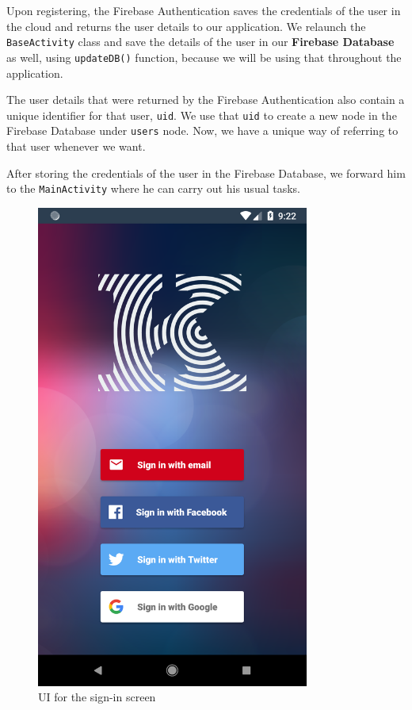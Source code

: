 Upon registering, the Firebase Authentication saves the credentials of the user in the cloud and returns the user details to our application. We relaunch the \texttt{BaseActivity} class and save the details of the user in our \textbf{Firebase Database} as well, using \texttt{updateDB()} function, because we will be using that throughout the application.

The user details that were returned by the Firebase Authentication also contain a unique identifier for that user, \texttt{uid}. We use that \texttt{uid} to create a new node in the Firebase Database under \texttt{users} node. Now, we have a unique way of referring to that user whenever we want.

After storing the credentials of the user in the Firebase Database, we forward him to the \texttt{MainActivity} where he can carry out his usual tasks.

\begin{figure}[H]
	\centering
		\includegraphics[width=0.80\textwidth]{images/khoji_signin.png}
	\caption{UI for the sign-in screen}
	\label{fig:khoji_signin}
\end{figure}


